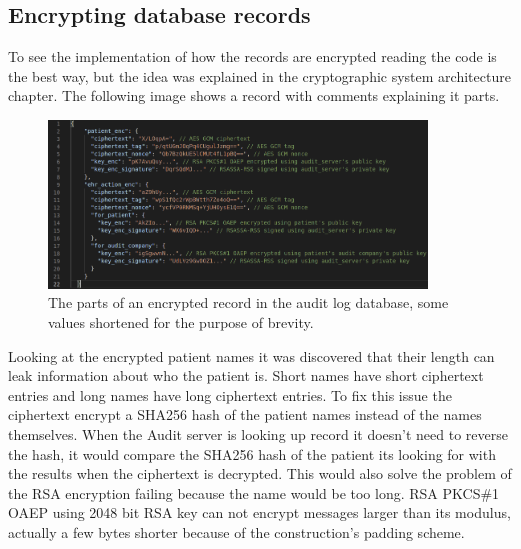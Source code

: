 \documentclass[11pt]{article}
\begin{document}
\begin{flushleft}
\subsection{Encrypting database records}

To see the implementation of how the records are encrypted reading the code is the best way, but the idea was explained in the cryptographic system architecture chapter. The following image shows a record with comments explaining it parts.

\newpage

\begin{figure}[h!]
	\begin{center}
		\includegraphics[width = 380px]{images/enc_record_parts.png}
		\caption{The parts of an encrypted record in the audit log database, some values shortened for the purpose of brevity.}
	\end{center}
\end{figure}

Looking at the encrypted patient names it was discovered that their length can leak information about who the patient is. Short names have short ciphertext entries and long names have long ciphertext entries. To fix this issue the ciphertext encrypt a SHA256 hash of the patient names instead of the names themselves. When the Audit server is looking up record it doesn't need to reverse the hash, it would compare the SHA256 hash of the patient its looking for with the results when the ciphertext is decrypted. This would also solve the problem of the RSA encryption failing because the name would be too long. RSA PKCS\#1 OAEP using 2048 bit RSA key can not encrypt messages larger than its modulus, actually a few bytes shorter because of the construction's padding scheme.

\newpage






\end{flushleft}
	
\end{document}
